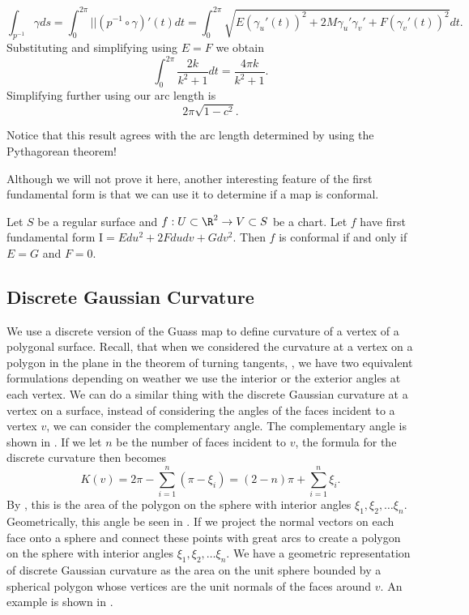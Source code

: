 \begin{example}
$$\int_{p^{-1}}\gamma ds=\int_{0}^{2\pi} ||(p^{-1}\circ \gamma)'(t)dt=\int_0^{2\pi}\sqrt{E(\gamma_u'(t))^2+2M\gamma_u'\gamma_v'+
F(\gamma_v'(t))^2}dt.$$
Substituting and simplifying using $E=F$ we obtain
$$\int_0^{2\pi}\frac{2k}{k^2+1}dt=\frac{4\pi k}{k^2+1}.$$
Simplifying further using   our arc length is
$$2\pi\sqrt{1-c^2}.$$

Notice that this result agrees with the arc length determined by using
the Pythagorean theorem!

\end{example}


Although we will not prove it here, another interesting feature of the first fundamental form is 
that we can use it to determine if a map is conformal.
\begin{theorem}\label{thm:first-conformal}
	Let $S$ be a regular surface and $f:U\subset \R^2 \to V\subset S$ be a chart.
	Let $f$ have first fundamental form $\mathrm{I}=Edu^2+2Fdudv +Gdv^2$.
	Then $f$ is conformal if and only if $E=G$ and $F=0.$
\end{theorem}


\subsection{Discrete Gaussian Curvature}
\label{sec:discrete}


We use a discrete version of the Guass map to define curvature
of a vertex of a polygonal surface.
Recall, that when we considered the curvature at a vertex on a polygon in the plane
in the theorem of turning tangents, , we have two equivalent
formulations depending on
weather we use the interior or the exterior angles at each vertex.
We can do a similar thing with the discrete Gaussian curvature at a vertex on a surface,
instead of considering the angles of the faces incident to a vertex $v$, we can consider
the complementary angle. The complementary angle is shown in . 
If we let $n$ be the number of faces
incident to $v$, the formula for the discrete curvature then becomes
\begin{equation}\label{eqn:discrete-curvature-complement-angle}
K(v)=2\pi - \sum_{i=1}^n (\pi - \xi_i)=(2-n)\pi +\sum_{i=1}^n \xi_i.
\end{equation}
By , this is the area of the polygon on the sphere with interior
angles $\xi_1, \xi_2,\ldots \xi_n.$
Geometrically, this angle be seen in .
If we project the normal vectors on each face onto a sphere and
connect these points with great arcs to create a polygon on the sphere with interior angles
$\xi_1, \xi_2,\ldots \xi_n.$
We have a geometric representation of discrete
Gaussian curvature as the area on the unit 
sphere bounded by a spherical polygon whose vertices are the unit normals of 
the faces around $v$. An example is shown in .

